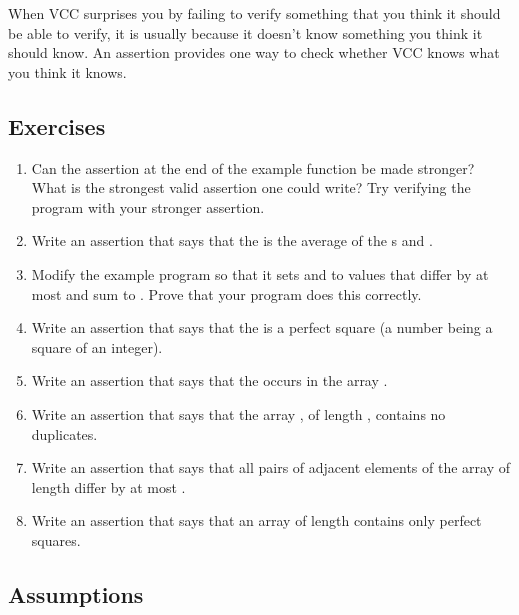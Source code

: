 When VCC surprises you by failing to verify something that you think
it should be able to verify, it is usually because it doesn't know
something you think it should know. An assertion provides one way to
check whether VCC knows what you think it knows.


\subsection*{Exercises}
\begin{enumerate}
\item Can the assertion at the end of the example function be made
  stronger? What is the strongest valid assertion one could write? Try 
  verifying the program with your stronger assertion.
\item Write an assertion that says that the   is the average of
  the s  and .
\item Modify the example program so that it sets  and  to values
that differ by at most  and sum to . Prove that your program 
does this correctly.
\item Write an assertion that says that the   is a
  perfect square (\ie a number being a square of an integer).
\item Write an assertion that says that the   occurs
  in the  array .
\item Write an assertion that says that the  array ,
  of length , contains no duplicates.
\item Write an assertion that says that all pairs of adjacent elements
  of the  array  of length  differ by at most
  .
\item Write an assertion that says that an array  of length
   contains only perfect squares.
\end{enumerate}

\subsection{Assumptions}


